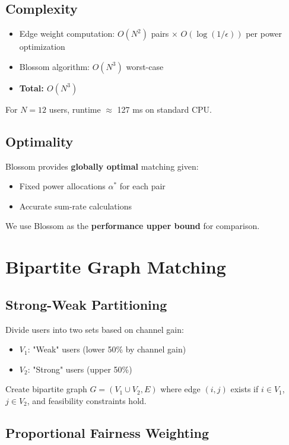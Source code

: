 \subsection{Complexity}
\begin{itemize}
    \item Edge weight computation: $O(N^2)$ pairs × $O(\log(1/\epsilon))$ per power optimization
    \item Blossom algorithm: $O(N^3)$ worst-case
    \item \textbf{Total: $O(N^3)$}
\end{itemize}

For $N=12$ users, runtime $\approx$ 127 ms on standard CPU.

\subsection{Optimality}

Blossom provides \textbf{globally optimal} matching given:
\begin{itemize}
    \item Fixed power allocations $\alpha^*$ for each pair
    \item Accurate sum-rate calculations
\end{itemize}

We use Blossom as the \textbf{performance upper bound} for comparison.

\section{Bipartite Graph Matching}

\subsection{Strong-Weak Partitioning}

Divide users into two sets based on channel gain:
\begin{itemize}
    \item $V_1$: "Weak" users (lower 50\% by channel gain)
    \item $V_2$: "Strong" users (upper 50\%)
\end{itemize}

Create bipartite graph $G = (V_1 \cup V_2, E)$ where edge $(i,j)$ exists if $i \in V_1$, $j \in V_2$, and feasibility constraints hold.

\subsection{Proportional Fairness Weighting}

